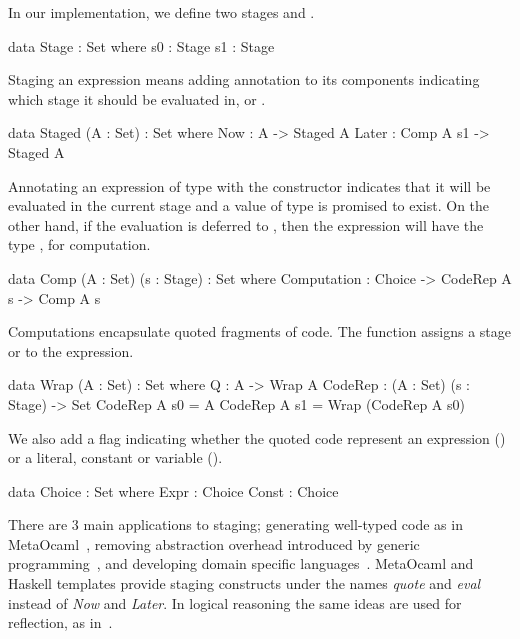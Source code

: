 In our implementation, we define two stages  and . 
\begin{togcode}
data Stage : Set where
  s0 : Stage
  s1 : Stage
\end{togcode} 

Staging an expression means adding annotation to its components indicating which stage it should be evaluated in, 
 or . 
\begin{togcode} 
data Staged (A : Set) : Set where
  Now : A -> Staged A
  Later : Comp A s1 -> Staged A
\end{togcode} 
Annotating an expression of type  with the  constructor indicates that it will be evaluated in the current stage and a value of type  is promised to exist. On the other hand, if the evaluation is deferred to , then the expression will have the type , for computation. 
\begin{togcode} 
data Comp (A : Set) (s : Stage) : Set where
  Computation : Choice -> CodeRep A s -> Comp A s
\end{togcode} 
Computations encapsulate quoted fragments of code. The  function assigns a stage  or  to the expression. 
\begin{togcode} 
data Wrap (A : Set) : Set where
  Q : A -> Wrap A
CodeRep : (A : Set) (s : Stage) -> Set
  CodeRep A s0 = A
  CodeRep A s1 = Wrap (CodeRep A s0)
\end{togcode} 
We also add a flag indicating whether the quoted code represent an expression () or a literal, constant or variable ().  
\begin{togcode} 
data Choice : Set where
  Expr : Choice
  Const : Choice
\end{togcode} 

There are $3$ main applications to staging; generating well-typed code as in \mbox{MetaOcaml}~\cite{taha1999multi}, removing abstraction overhead introduced by generic programming~\cite{yallop2016StagingGeneric, carette2011mspFunctorsMonads, carette2011generative}, and developing domain specific languages~\cite{sheard2000stagingDSL}. MetaOcaml and Haskell templates provide staging constructs under the names \emph{quote} and \emph{eval} instead of \emph{Now} and \emph{Later}. In logical reasoning the same ideas are used for reflection, as in~\cite{farmer2013quoteEval}.  



